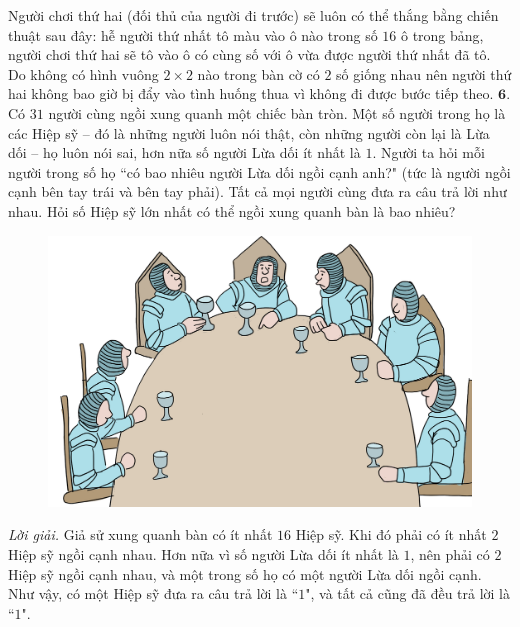 \begin{multicols}{2}
\begin{figure}[H]
		\vspace*{-5pt}
	\end{figure}
	Người chơi thứ hai (đối thủ của người đi trước) sẽ luôn có thể thắng bằng chiến thuật sau đây: hễ người thứ nhất tô màu vào ô nào trong số $16$ ô trong bảng, người chơi thứ hai sẽ tô vào ô có cùng số với ô vừa được người thứ nhất đã tô. Do không có hình vuông $2\times2$ nào trong bàn cờ có $2$ số giống nhau nên người thứ hai không bao giờ bị đẩy vào tình huống thua vì không đi được bước tiếp theo.
	\vskip 0.1cm
	$\pmb{6.}$ Có $31$ người cùng ngồi xung quanh một chiếc bàn tròn. Một số người trong họ là các Hiệp sỹ -- đó là những người luôn nói thật, còn những người còn lại là Lừa dối -- họ luôn nói sai, hơn nữa số người Lừa dối ít nhất là $1$. Người ta hỏi mỗi người trong số họ ``có bao nhiêu người Lừa dối ngồi cạnh anh?" (tức là người ngồi cạnh bên tay trái và bên tay phải). Tất cả mọi người cùng đưa ra câu trả lời như nhau. Hỏi số Hiệp sỹ lớn nhất có thể ngồi xung quanh bàn là bao nhiêu?
	\begin{figure}[H]
		\vspace*{-5pt}
		\centering
		\captionsetup{labelformat= empty, justification=centering}
		\includegraphics[width= 1\linewidth]{bai6}
		\vspace*{-10pt}
	\end{figure}
	\textit{Lời giải.} Giả sử xung quanh bàn có ít nhất $16$ Hiệp sỹ. Khi đó phải có ít  nhất $2$ Hiệp sỹ ngồi cạnh nhau. Hơn nữa vì số người Lừa dối ít nhất là $1$, nên phải có $2$ Hiệp sỹ ngồi cạnh nhau, và một trong số họ có một người Lừa dối ngồi cạnh. Như vậy, có một Hiệp sỹ đưa ra câu trả lời là ``$1$", và tất cả cũng đã đều trả lời là ``$1$".

\end{multicols}
